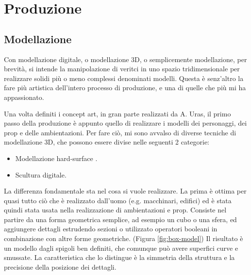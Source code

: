 
\chapter{Produzione} %

\label{Chapter5} %


\section{Modellazione}

Con modellazione digitale, o modellazione 3D, o semplicemente modellazione, per brevità, si intende la manipolazione di veritci in uno spazio tridimensionale per realizzare solidi più o meno complessi denominati modelli.
Questa è senz'altro la fare più artistica dell'intero processo di produzione, e una di quelle che più mi ha appassionato.

Una volta definiti i concept art, in gran parte realizzati da A. Uras, il primo passo della produzione è appunto quello di realizzare i modelli dei personaggi, dei prop e delle ambientazioni.
Per fare ciò, mi sono avvalso di diverse tecniche di modellazione 3D, che possono essere divise nelle seguenti 2 categorie:
\begin{itemize}
    \item Modellazione hard-surface \cite{hardSurf}.
    \item Scultura digitale\cite{3Dsculpt}.
\end{itemize}
La differenza fondamentale sta nel cosa si vuole realizzare. La prima è ottima per quasi tutto ciò che è realizzato dall'uomo (e.g. macchinari, edifici) ed è stata quindi stata usata nella realizzazione di ambientazioni e prop.
Consiste nel partire da una forma geometrica semplice, ad esempio un cubo o una sfera, ed aggiungere dettagli estrudendo sezioni o utilizzato operatori booleani in combinazione con altre forme geometriche. (Figura \ref{fig:box-model})
Il risultato è un modello dagli spigoli ben definiti, che comunque può avere superfici curve e smussate.
La caratteristica che lo distingue è la simmetria della struttura e la precisione della posizione dei dettagli. 


